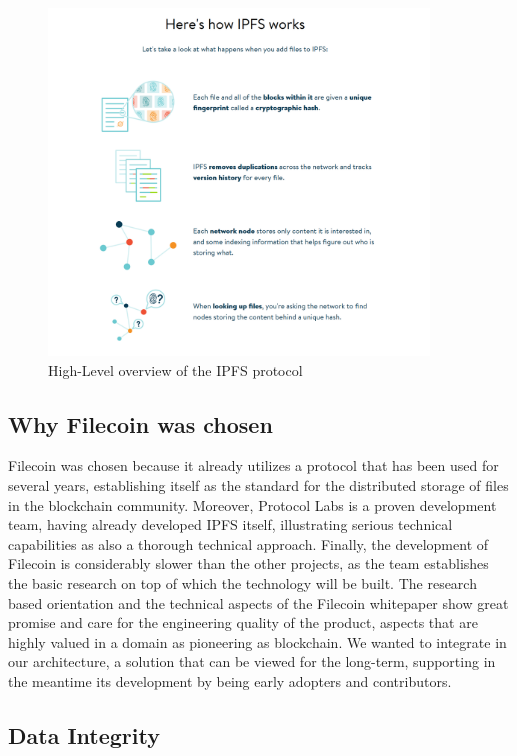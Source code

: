 \begin{figure}[h]
    \centering
    \includegraphics[width=0.9\textwidth]{images/ipfs.png}
    \caption{High-Level overview of the IPFS protocol \cite{ipfslabs}}
    \label{fig:ipfs}
\end{figure}

\subsection{Why Filecoin was chosen}

Filecoin was chosen because it already utilizes a protocol that has been used for several years, establishing itself as the standard for the distributed storage of files in the blockchain community. Moreover, Protocol Labs is a proven development team, having already developed IPFS itself, illustrating serious technical capabilities as also a thorough technical approach. Finally, the development of Filecoin is considerably slower than the other projects, as the team establishes the basic research on top of which the technology will be built. The research based orientation and the technical aspects of the Filecoin whitepaper\cite{filecoin-whitepaper} show great promise and care for the engineering quality of the product, aspects that are highly valued in a domain as pioneering as blockchain. We wanted to integrate in our architecture, a solution that can be viewed for the long-term, supporting in the meantime its development by being early adopters and contributors.

\subsection{Data Integrity}

